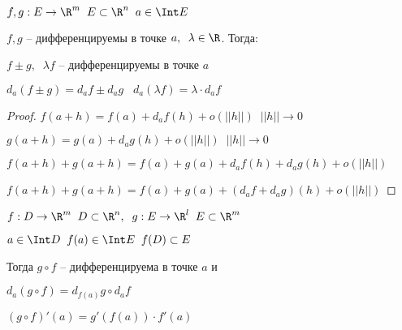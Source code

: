 
\begin{theorem}\slashns
    
    $f,g : E \to \R^m \;\; E\subset \R^n \;\; a \in \Int E$
    
    $f,g$ -- дифференцируемы в точке $a,\;\; \lambda \in \R$. Тогда:
    
    $f\pm g,\;\; \lambda f$ -- дифференцируемы в точке $a$
    
    
    $d_a(f\pm g) = d_af \pm d_a g \;\;\; d_a(\lambda f) = \lambda \cdot d_a f$
\end{theorem}

\begin{proof} \slashns
    
    $f(a + h) = f(a) + d_a f(h) + o(||h||) \;\; ||h|| \to 0$
    
    $g(a + h) = g(a) + d_a g(h) + o(||h||) \;\; ||h|| \to 0$
    
    $f(a + h) + g(a + h) = f(a) + g(a) + d_a f(h) + d_a g(h) + o(||h||)$
    
    $f(a + h) + g(a + h) = f(a) + g(a) + (d_a f+ d_a g)(h) + o(||h||)$
    
\end{proof}

\begin{theorem}\slashns
    
    $f: D \to \R^m \;\; D\subset \R^n, \;\; g : E \to \R^l \;\; E\subset \R^m$
    
    $a\in \Int D \;\; f(a) \in \Int E \;\; f(D) \subset E$
    
    Тогда $g\circ f$ -- дифференцируема в точке $a$ и
    
    $d_a(g\circ f) = d_{f(a)} g \circ d_a f$
\end{theorem}

\begin{remark}\slashns
    
    $(g\circ f)'(a) = g'(f(a))\cdot f'(a)$
\end{remark}

